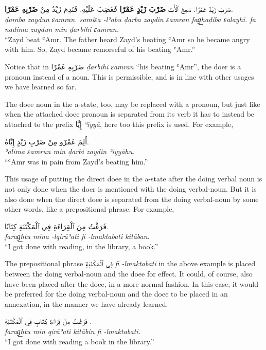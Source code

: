 \documentclass[
  10pt,
]{book}
\begin{document}
\foreignlanguage{arabic}{ضَرَبَ زَيْدٌ عَمْرًا. سَمِعَ ٱلْأَبُ \textbf{ضَرْبَ زَيْدٍ عَمْرًا} فَغَضِبَ عَلَيْهِ. فَنَدِمَ زَيْدٌ مِنْ \textbf{ضَرْبِهِ عَمْرًا}.}\\
\emph{ḍaraba zaydun ɛamran. samiɛa -lʾabu ḍarba zaydin ɛamran fag͟haḍiba ɛalayhi. fa nadima zaydun min ḍarbihi ɛamran.}\\
\enquote{Zayd beat ʿAmr. The father heard Zayd's beating ʿAmr so he became angry with him. So, Zayd became remorseful of his beating ʿAmr.}

Notice that in \foreignlanguage{arabic}{ضَرْبِهِ عَمْرًا} \emph{ḍarbihi ɛamran} \enquote{his beating ʿAmr}, the doer is a pronoun instead of a noun. This is permissible, and is in line with other usages we have learned so far.

The doee noun in the a-state, too, may be replaced with a pronoun, but just like when the attached doee pronoun is separated from its verb it has to instead be attached to the prefix \foreignlanguage{arabic}{إِيَّا} \emph{ʾiyyā}, here too this prefix is used. For example,

\foreignlanguage{arabic}{أَلِمَ عَمْرٌو مِنْ ضَرْبِ زَيْدٍ إِيَّاهُ.}\\
\emph{ʾalima ɛamrun min ḍarbi zaydin ʾiyyāhu.}\\
\enquote{ʿAmr was in pain from Zayd's beating him.}

This usage of putting the direct doee in the a-state after the doing verbal noun is not only done when the doer is mentioned with the doing verbal-noun. But it is also done when the direct doee is separated from the doing verbal-noun by some other words, like a prepositional phrase. For example,

\foreignlanguage{arabic}{فَرَغْتُ مِنَ ٱلْقِرَاءَةِ فِي ٱلْمَکْتَبَةِ کِتَابًا.}\\
\emph{farag͟htu mina -lqirāʾati fi -lmaktabati kitāban.}\\
\enquote{I got done with reading, in the library, a book.}

The prepositional phrase \foreignlanguage{arabic}{فِي ٱلْمَکْتَبَةِ} \emph{fi -lmaktabati} in the above example is placed between the doing verbal-noun and the doee for effect. It could, of course, also have been placed after the doee, in a more normal fashion. In this case, it would be preferred for the doing verbal-noun and the doee to be placed in an annexation, in the manner we have already learned.

\foreignlanguage{arabic}{فَرَغْتُ مِنْ قِرَاءَةِ کِتَابٍ فِي ٱلْمَکْتَبَةِ .}\\
\emph{farag͟htu min qirāʾati kitābin fi -lmaktabati.}\\
\enquote{I got done with reading a book in the library.}
\end{document}
